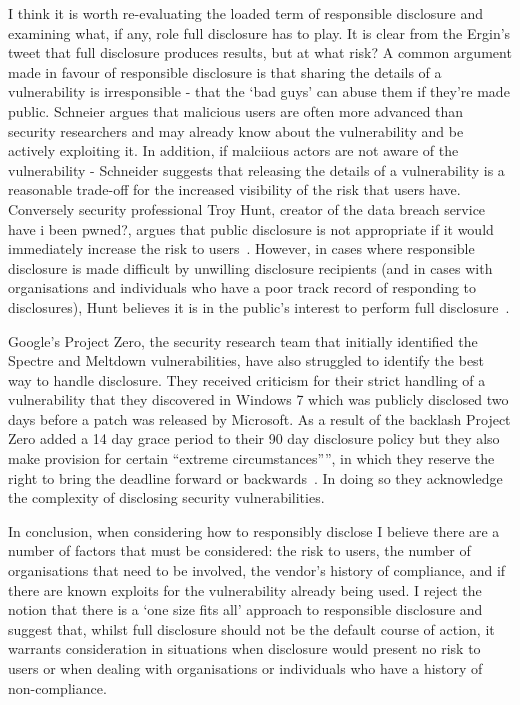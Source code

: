 \documentclass[]{final_report}
\begin{document}
I think it is worth re-evaluating the loaded term of responsible disclosure and examining what, if any, role full disclosure has to play. It is clear from the Ergin's tweet that full disclosure produces results, but at what risk? A common argument made in favour of responsible disclosure is that sharing the details of a vulnerability is irresponsible - that the `bad guys' can abuse them if they're made public. Schneier argues that malicious users are often more advanced than security researchers and may already know about the vulnerability and be actively exploiting it. In addition, if malciious actors are not aware of the vulnerability - Schneider suggests that releasing the details of a vulnerability is a reasonable trade-off for the increased visibility of the risk that users have. Conversely security professional Troy Hunt, creator of the data breach service have i been pwned?, argues that public disclosure is not appropriate if it would immediately increase the risk to users~\cite{responsibility-of-public-disclosure}. However, in cases where responsible disclosure is made difficult by unwilling disclosure recipients (and in cases with organisations and individuals who have a poor track record of responding to disclosures), Hunt believes it is in the public's interest to perform full disclosure~\cite{kids-pass-responsible-disclosure}.

Google's Project Zero, the security research team that initially identified the Spectre and Meltdown vulnerabilities, have also struggled to identify the best way to handle disclosure. They received criticism for their strict handling of a vulnerability that they discovered in Windows 7 which was publicly disclosed two days before a patch was released by Microsoft. As a result of the backlash Project Zero added a 14 day grace period to their 90 day disclosure policy but they also make provision for certain ``extreme circumstances””, in which they reserve the right to bring the deadline forward or backwards~\cite{project-zero-update-policy}. In doing so they acknowledge the complexity of disclosing security vulnerabilities.

In conclusion, when considering how to responsibly disclose I believe there are a number of factors that must be considered: the risk to users, the number of organisations that need to be involved, the vendor's history of compliance, and if there are known exploits for the vulnerability already being used. I reject the notion that there is a `one size fits all' approach to responsible disclosure and suggest that, whilst full disclosure should not be the default course of action, it warrants consideration in situations when disclosure would present no risk to users or when dealing with organisations or individuals who have a history of non-compliance.
\end{document}
